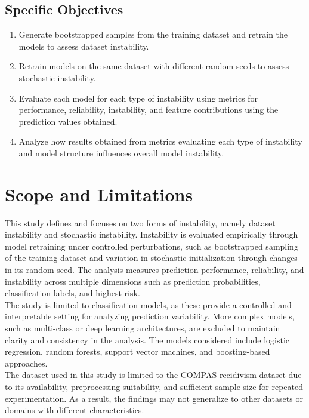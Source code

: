 \documentclass[12pt]{article}
\begin{document}
\subsection{Specific Objectives}
\begin{enumerate}
  \item Generate bootstrapped samples from the training dataset and retrain the models to assess dataset instability.
  \item Retrain models on the same dataset with different random seeds to assess stochastic instability.
  \item Evaluate each model for each type of instability using metrics for performance, reliability, instability, and feature contributions using the prediction values obtained. 
  \item Analyze how results obtained from metrics evaluating each type of instability and model structure influences overall model instability. 
\end{enumerate}

\section{Scope and Limitations} 
\tab%
This study defines and focuses on two forms of instability, namely dataset instability and stochastic instability. Instability is evaluated empirically through model retraining under controlled perturbations, such as  bootstrapped sampling of the training dataset and variation in stochastic initialization through changes in its random seed. The analysis measures prediction performance, reliability, and instability across multiple dimensions such as prediction probabilities, classification labels, and highest risk.\\

The study is limited to classification models, as these provide a controlled and interpretable setting for analyzing prediction variability. More complex models, such as multi-class or deep learning architectures, are excluded to maintain clarity and consistency in the analysis. The models considered include logistic regression, random forests, support vector machines, and boosting-based approaches.\\

The dataset used in this study is limited to the COMPAS recidivism dataset due to its availability, preprocessing suitability, and sufficient sample size for repeated experimentation. As a result, the findings may not generalize to other datasets or domains with different characteristics.\\
\end{document}
